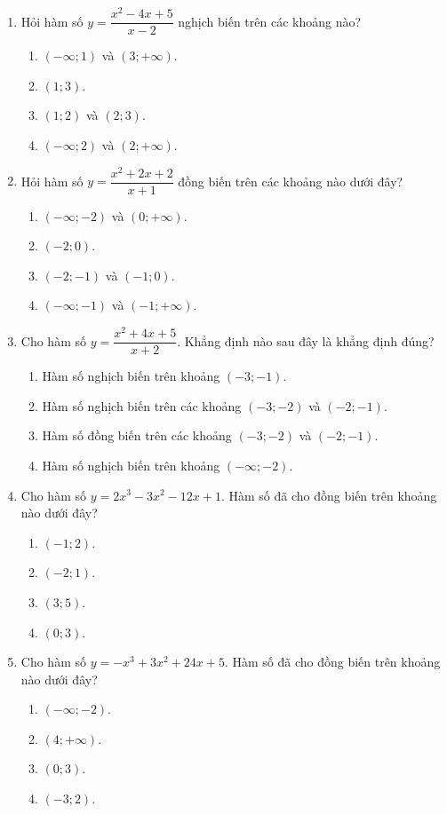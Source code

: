 \documentclass[12pt]{article}
\begin{document}
\begin{enumerate}[label=\textbf{Câu \arabic*.}]
		
		\item Hỏi hàm số $y = \dfrac{x^2 - 4x + 5}{x - 2}$ nghịch biến trên các khoảng nào?
		\begin{enumerate}[label=\textbf{\Alph*.}]
			\item $(-\infty; 1)$ và $(3; +\infty)$.
			\item $(1; 3)$.
			\item $(1; 2)$ và $(2; 3)$.
			\item $(-\infty; 2)$ và $(2; +\infty)$.
		\end{enumerate}
		
		\item Hỏi hàm số $y = \dfrac{x^2 + 2x + 2}{x + 1}$ đồng biến trên các khoảng nào dưới đây?
		\begin{enumerate}[label=\textbf{\Alph*.}]
			\item $(-\infty; -2)$ và $(0; +\infty)$.
			\item $(-2; 0)$.
			\item $(-2; -1)$ và $(-1; 0)$.
			\item $(-\infty; -1)$ và $(-1; +\infty)$.
		\end{enumerate}
		
		\item Cho hàm số $y = \dfrac{x^2+4x+5}{x+2}$. Khẳng định nào sau đây là khẳng định đúng?
		\begin{enumerate}[label=\textbf{\Alph*.}]
			\item Hàm số nghịch biến trên khoảng $(-3; -1)$.
			\item Hàm số nghịch biến trên các khoảng $(-3; -2)$ và $(-2; -1)$.
			\item Hàm số đồng biến trên các khoảng $(-3; -2)$ và $(-2; -1)$.
			\item Hàm số nghịch biến trên khoảng $(-\infty; -2)$.
		\end{enumerate}
		
		\item Cho hàm số $y = 2x^3 - 3x^2 - 12x + 1$. Hàm số đã cho đồng biến trên khoảng nào dưới đây?
		\begin{enumerate}[label=\textbf{\Alph*.}]
			\item $(-1; 2)$.
			\item $(-2; 1)$.
			\item $(3; 5)$.
			\item $(0; 3)$.
		\end{enumerate}
		
		\item Cho hàm số $y = -x^3 + 3x^2 + 24x + 5$. Hàm số đã cho đồng biến trên khoảng nào dưới đây?
		\begin{enumerate}[label=\textbf{\Alph*.}]
			\item $(-\infty; -2)$.
			\item $(4; +\infty)$.
			\item $(0; 3)$.
			\item $(-3; 2)$.
		\end{enumerate}
		

\end{enumerate}
\end{document}
